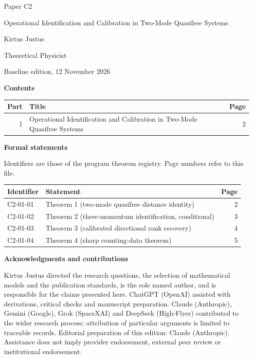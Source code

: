 \documentclass[11pt,a4paper]{article}
\begin{document}
\thispagestyle{empty}\pagestyle{empty}
{\small\sffamily \ProgramTitle\hfill Paper C2\par}
\vspace*{12mm}
{\LARGE\bfseries\raggedright{} Operational Identification and Calibration in Two-Mode Quasifree Systems\par}
\vspace{9mm}
{\large Kirtus Justus\par}\vspace{1mm}Theoretical Physicist\par\AuthorLocation\par\vspace{2mm}Baseline edition, 12 November 2026\par\vspace{8mm}
\textbf{Contents}\par\vspace{1mm}
{\small\begin{longtable}{@{}r>{\raggedright\arraybackslash}p{}r@{}}
\toprule Part & Title & Page\\\midrule\endhead
1 & Operational Identification and Calibration in Two-Mode Quasifree Systems & 2\\
\bottomrule\end{longtable}}
\vspace{2mm}\textbf{Formal statements}\par\vspace{1mm}
{\footnotesize Identifiers are those of the program theorem registry. Page numbers refer to this file.\par}
{\footnotesize\begin{longtable}{@{}l>{\raggedright\arraybackslash}p{}r@{}}
\toprule Identifier & Statement & Page\\\midrule\endhead
C2-01-01 & Theorem 1 (two-mode quasifree distance identity) & 2\\
C2-01-02 & Theorem 2 (three-momentum identification, conditional) & 3\\
C2-01-03 & Theorem 3 (calibrated directional rank recovery) & 4\\
C2-01-04 & Theorem 4 (sharp counting-data theorem) & 5\\
\bottomrule\end{longtable}}
\vspace{3mm}\textbf{Acknowledgments and contributions}\par
{\small Kirtus Justus directed the research questions, the selection of mathematical models and the publication standards, is the sole named author, and is responsible for the claims presented here. ChatGPT (OpenAI) assisted with derivations, critical checks and manuscript preparation. Claude (Anthropic), Gemini (Google), Grok (SpaceXAI) and DeepSeek (High-Flyer) contributed to the wider research process; attribution of particular arguments is limited to traceable records. Editorial preparation of this edition: Claude (Anthropic). Assistance does not imply provider endorsement, external peer review or institutional endorsement.\par}
\end{document}
